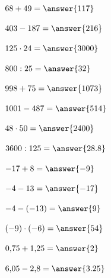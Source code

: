 \documentclass{ximera}
\begin{document}
\begin{oefening}[Rekenroutine B]{\oefB}

\begin{question} \(68+49=\answer{117}\) \end{question}

\begin{question} \(403-187=\answer{216}\) \end{question}

\begin{question} \(125\cdot24=\answer{3000}\) \end{question}

\begin{question} \(800:25=\answer{32}\) \end{question}

\begin{question} \(998+75=\answer{1073}\) \end{question}

\begin{question} \(1001-487=\answer{514}\) \end{question}

\begin{question} \(48\cdot50=\answer{2400}\) \end{question}

\begin{question} \(3600:125=\answer{28.8}\) \end{question}

\begin{question} \(-17+8=\answer{-9}\) \end{question}

\begin{question} \(-4-13=\answer{-17}\) \end{question}

\begin{question} \(-4-(-13)=\answer{9}\) \end{question}

\begin{question} \((-9)\cdot(-6)=\answer{54}\) \end{question}

\begin{question} \(0{,}75+1{,}25=\answer{2}\) \end{question}

\begin{question} \(6{,}05-2{,}8=\answer{3.25}\) \end{question}


\end{oefening}
\end{document}
